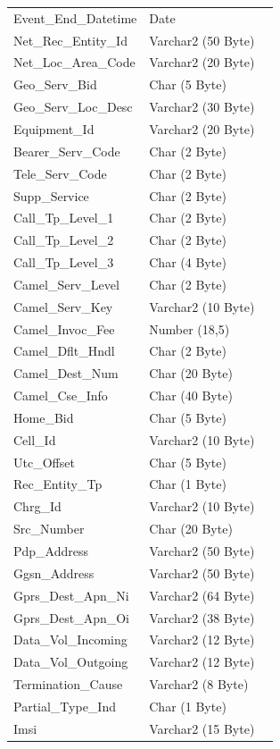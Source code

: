 \documentclass[12pt,twoside]{article}
\begin{document}
\begin{longtable}{l|l|l}
Event\_End\_Datetime & Date & \\
Net\_Rec\_Entity\_Id & Varchar2 (50 Byte) & \\
Net\_Loc\_Area\_Code & Varchar2 (20 Byte) & \\
Geo\_Serv\_Bid & Char (5 Byte) & \\
Geo\_Serv\_Loc\_Desc & Varchar2 (30 Byte) & \\
Equipment\_Id & Varchar2 (20 Byte) & \\
Bearer\_Serv\_Code & Char (2 Byte) & \\
Tele\_Serv\_Code & Char (2 Byte) & \\
Supp\_Service & Char (2 Byte) & \\
Call\_Tp\_Level\_1 & Char (2 Byte) & \\
Call\_Tp\_Level\_2 & Char (2 Byte) & \\
Call\_Tp\_Level\_3 & Char (4 Byte) & \\
Camel\_Serv\_Level & Char (2 Byte) & \\
Camel\_Serv\_Key & Varchar2 (10 Byte) & \\
Camel\_Invoc\_Fee & Number (18,5) & \\
Camel\_Dflt\_Hndl & Char (2 Byte) & \\
Camel\_Dest\_Num & Char (20 Byte) & \\
Camel\_Cse\_Info & Char (40 Byte) & \\
Home\_Bid & Char (5 Byte) & \\
Cell\_Id & Varchar2 (10 Byte) & \\
Utc\_Offset & Char (5 Byte) & \\
Rec\_Entity\_Tp & Char (1 Byte) & \\
Chrg\_Id & Varchar2 (10 Byte) & \\
Src\_Number & Char (20 Byte) & \\
Pdp\_Address & Varchar2 (50 Byte) & \\
Ggsn\_Address & Varchar2 (50 Byte) & \\
Gprs\_Dest\_Apn\_Ni & Varchar2 (64 Byte) & \\
Gprs\_Dest\_Apn\_Oi & Varchar2 (38 Byte) & \\
Data\_Vol\_Incoming & Varchar2 (12 Byte) & \\
Data\_Vol\_Outgoing & Varchar2 (12 Byte) & \\
Termination\_Cause & Varchar2 (8 Byte) & \\
Partial\_Type\_Ind & Char (1 Byte) & \\
Imsi & Varchar2 (15 Byte) & \\

\end{longtable}
\end{document}
